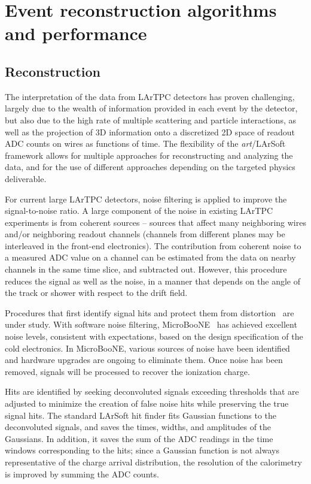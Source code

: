 \section{Event reconstruction algorithms and performance}
\label{sec:larsoftreco}

\subsection{Reconstruction}

The interpretation of the data from LArTPC detectors has
proven challenging, largely due to the wealth of information provided
in each event by the detector, but also due to the high rate of
multiple scattering and particle interactions, as well as the
projection of 3D information onto a discretized
2D space of readout ADC counts on wires as functions of
time.  The flexibility of the {\textit{art}}/LArSoft framework allows for
multiple approaches for reconstructing and analyzing the data, %
and for the use of different approaches %
depending on the targeted physics deliverable.

For current large LArTPC detectors, noise filtering is applied to improve
the signal-to-noise ratio.  A
large component of the noise in existing LArTPC experiments is from coherent sources -- sources that
affect many neighboring wires and/or neighboring readout channels
(channels from different planes may be interleaved in the front-end
electronics).  
The contribution from coherent noise to a measured ADC value on a channel can be estimated from the data on nearby channels in the same time slice, and subtracted out.
However, this procedure reduces the signal as
well as the noise, in a manner that depends on the angle of the track or
shower with respect to the drift field.  

Procedures that first
identify signal hits and protect them from distortion~\cite{microboone-noise} 
are under study. With software noise filtering, MicroBooNE~\cite{noise_filter}
has achieved excellent noise levels, consistent with expectations, based on 
the design specification of the cold electronics. 
  In MicroBooNE, various 
sources of noise have been identified and hardware upgrades 
are ongoing to eliminate them.   Once noise has been removed,
signals will be processed to recover the ionization charge.

Hits are identified by seeking deconvoluted signals exceeding
thresholds that are adjusted to minimize the creation of false noise
hits while preserving the true signal hits.  The standard LArSoft hit
finder fits Gaussian functions to the deconvoluted signals, and saves the
times, widths, and amplitudes of the Gaussians.  In addition, it saves the sum of
the ADC readings in the time windows corresponding to the hits; since a
Gaussian function is not always representative of the charge arrival
distribution, the resolution of the calorimetry is improved by
summing the ADC counts.

